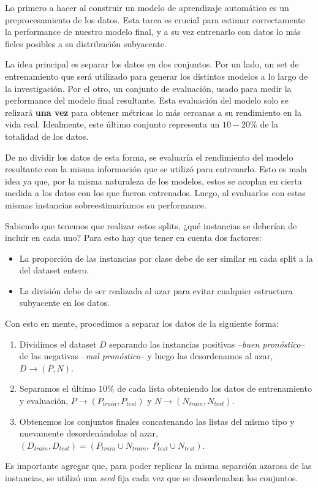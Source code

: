 Lo primero a hacer al construir un modelo de aprendizaje automático es un preprocesamiento de los datos. Esta tarea es crucial para estimar correctamente la performance de nuestro modelo final, y a su vez entrenarlo con datos lo más fieles posibles a su distribución subyacente. 

La idea principal es separar los datos en dos conjuntos. Por un lado, un set de entrenamiento que será utilizado para generar los distintos modelos a lo largo de la investigación. Por el otro, un conjunto de evaluación, usado para medir la performance del modelo final resultante. Esta evaluación del modelo solo se relizará \textbf{una vez} para obtener métricas lo más cercanas a su rendimiento en la vida real. Idealmente, este último conjunto representa un $10-20\%$ de la totalidad de los datos.

De no dividir los datos de esta forma, se evaluaría el rendimiento del modelo resultante con la misma información que se utilizó para entrenarlo. Esto es mala idea ya que, por la misma naturaleza de los modelos, estos se acoplan en cierta medida a los datos con los que fueron entrenados. Luego, al evaluarlos con estas mismas instancias sobreestimaríamos su performance.

Sabiendo que tenemos que realizar estos splits, ¿qué instancias se deberían de incluir en cada uno? Para esto hay que tener en cuenta dos factores:

\begin{itemize}
    \item La proporción de las instancias por clase debe de ser similar en cada split a la del dataset entero.
    \item La división debe de ser realizada al azar para evitar cualquier estructura subyacente en los datos.
\end{itemize}

Con esto en mente, procedimos a separar los datos de la siguiente forma:

\begin{enumerate}
    \item Dividimos el dataset $D$ separando las instancias positivas --\textit{buen pronóstico}-- de las negativas --\textit{mal pronóstico}-- y luego las desordenamos al azar, $D \rightarrow (P, N)$.
    \item Separamos el último $10\%$ de cada lista obteniendo los datos de entrenamiento y evaluación, $P \rightarrow (P_{train}, P_{test})$ y $N \rightarrow (N_{train}, N_{test})$.
    \item Obtenemos los conjuntos finales concatenando las listas del mismo tipo y nuevamente desordenándolas al azar, $(D_{train}, D_{test}) = (P_{train} \cup N_{train},\ P_{test} \cup N_{test})$.
\end{enumerate}

Es importante agregar que, para poder replicar la misma separción azarosa de las instancias, se utilizó una \textit{seed} fija cada vez que se desordenaban los conjuntos.